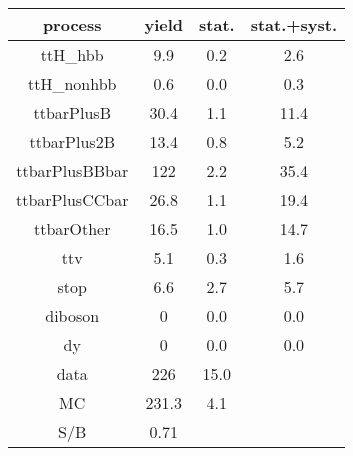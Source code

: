 \begin{tabular}{cccc}
\hline
    process     &  yield  &  stat.  &  stat.+syst.  \\
\hline
    ttH\_hbb     &   9.9   &   0.2   &      2.6      \\
   ttH\_nonhbb   &   0.6   &   0.0   &      0.3      \\
   ttbarPlusB   &  30.4   &   1.1   &     11.4      \\
  ttbarPlus2B   &  13.4   &   0.8   &      5.2      \\
 ttbarPlusBBbar &   122   &   2.2   &     35.4      \\
 ttbarPlusCCbar &  26.8   &   1.1   &     19.4      \\
   ttbarOther   &  16.5   &   1.0   &     14.7      \\
      ttv       &   5.1   &   0.3   &      1.6      \\
      stop      &   6.6   &   2.7   &      5.7      \\
    diboson     &    0    &   0.0   &      0.0      \\
       dy       &    0    &   0.0   &      0.0      \\
\hline
      data      &   226   &  15.0   &               \\
       MC       &  231.3  &   4.1   &               \\
\hline
      S/B       &  0.71   &         &               \\
\hline
\end{tabular}
